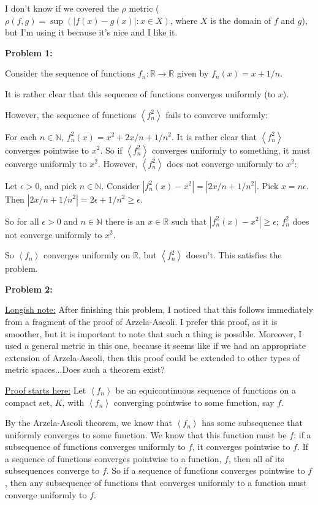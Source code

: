 \documentclass[a4paper,12pt]{article}
\newcommand{\tab}{\hspace{4mm}} %
\newcommand{\shunt}{\vspace{20mm}}
\newcommand{\absval}[1]{\left\lvert #1 \right\rvert}
\newcommand{\anbrack}[1]{\left\langle #1 \right\rangle}
\newcommand{\ep}{\epsilon}
\newcommand{\rh}{\rho}
\newcommand{\N}{\mathbb{N}}
\newcommand{\R}{\mathbb{R}}
\begin{document}
I don't know if we covered the $\rh$ metric ($\rh(f,g) = \sup(\absval{f(x)-g(x)}: x \in X)$, where $X$ is the domain of $f$ and $g$), but I'm using it because it's nice and I like it.

{\bf Problem 1:}

Consider the sequence of functions $f_n:\R \to \R $ given by $ f_n(x) =x + 1/n$.

It is rather clear that this sequence of functions converges uniformly (to $x$).

However, the sequence of functions $\anbrack{f_n^2}$ fails to converve uniformly:

\tab For each $n \in \N$, $f_n^2(x) = x^2 + 2x/n + 1/n^2$. It is rather clear that $\anbrack{f_n^2}$ converges pointwise to $x^2$. So if $\anbrack{f_n^2}$ converges uniformly to something, it must converge uniformly to $x^2$. However, $\anbrack{f_n^2}$ does not converge uniformly to $x^2$:

\tab \tab Let $\ep >0$, and pick $n \in \N$. Consider $\absval{f_n^2(x)- x^2} = \absval{2x/n + 1/n^2}$. Pick $x = n \ep$. Then $\absval{2x/n + 1/n^2} = 2\ep + 1/n^2 \geq \ep$.

\tab \tab So for all $\ep > 0$ and $n \in \N$ there is an $x \in \R$ such that $\absval{f_n^2(x) - x^2} \geq \ep$; $f_n^2$ does not converge uniformly to $x^2$.

So $\anbrack{f_n}$ converges uniformly on $\R$, but $\anbrack{f_n^2}$ doesn't. This satisfies the problem.

\shunt

{\bf Problem 2:}

\underline{Longish note:} After finishing this problem, I noticed that this follows immediately from a fragment of the proof of Arzela-Ascoli. I prefer this proof, as it is smoother, but it is important to note that such a thing is possible. Moreover, I used a general metric in this one, because it seems like if we had an appropriate extension of Arzela-Ascoli, then this proof could be extended to other types of metric spaces...Does such a theorem exist?

\underline{Proof starts here:} Let $\anbrack{f_n}$ be an equicontinuous sequence of functions on a compact set, $K$, with $\anbrack{f_n}$ converging pointwise to some function, say $f$.

By the Arzela-Ascoli theorem, we know that $\anbrack{f_n}$ has some subsequence that uniformly converges to some function. We know that this function must be $f$: if a subsequence of functions converges uniformly to $f$, it converges pointwise to $f$. If a sequence of functions converges pointwise to a function, $f$, then all of its subsequences converge to $f$. So if a sequence of functions converges pointwise to $f$, then any subsequence of functions that converges uniformly to a function must converge uniformly to $f$.
\end{document}
